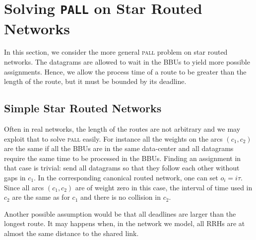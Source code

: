 \documentclass[a4paper,10pt]{journal}
\newcommand\pall{\textsc{pall}\xspace}
\begin{document}
         \section{Solving \texttt{PALL} on Star Routed Networks}\label{sec:PALL}
    
    In this section, we consider the more general \pall problem on star routed networks. The datagrams are allowed to wait in the BBUs to yield more possible assignments. Hence, we allow the process time of a route to be greater than the length of the route, but it must be bounded by its deadline.


	\subsection{Simple Star Routed Networks}
		

	Often in real networks, the length of the routes are not arbitrary and we may exploit that to solve \pall easily. For instance all the weights on the arcs $(c_1,c_2)$ are the same if all the BBUs are in the same data-center and all datagrams require the same time to be processed in the BBUs.
Finding an assignment in that case is trivial: send all datagrams so that they follow each other without gaps in $c_1$. In the corresponding canonical routed network, one can set $o_i = i\tau$.  Since all arcs $(c_1,c_2)$ are of weight zero in this case, the interval of time used in $c_2$ are the same as for $c_1$ and there is no collision in $c_2$.

	Another possible assumption would be that all deadlines are larger than the longest route. It may happens when, in the network we model, all RRHs are at almost the same distance to the shared link.
\end{document}
